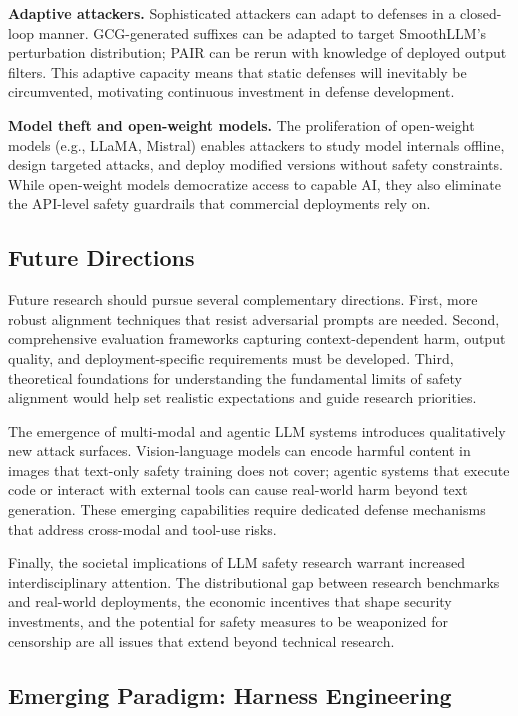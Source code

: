 \documentclass[conference]{IEEEtran}
\begin{document}
\textbf{Adaptive attackers.} Sophisticated attackers can adapt to defenses in a closed-loop manner. GCG-generated suffixes can be adapted to target SmoothLLM's perturbation distribution; PAIR can be rerun with knowledge of deployed output filters. This adaptive capacity means that static defenses will inevitably be circumvented, motivating continuous investment in defense development.

\textbf{Model theft and open-weight models.} The proliferation of open-weight models (e.g., LLaMA, Mistral) enables attackers to study model internals offline, design targeted attacks, and deploy modified versions without safety constraints. While open-weight models democratize access to capable AI, they also eliminate the API-level safety guardrails that commercial deployments rely on.

\subsection{Future Directions}

Future research should pursue several complementary directions. First, more robust alignment techniques that resist adversarial prompts are needed. Second, comprehensive evaluation frameworks capturing context-dependent harm, output quality, and deployment-specific requirements must be developed. Third, theoretical foundations for understanding the fundamental limits of safety alignment would help set realistic expectations and guide research priorities.

The emergence of multi-modal and agentic LLM systems introduces qualitatively new attack surfaces. Vision-language models can encode harmful content in images that text-only safety training does not cover; agentic systems that execute code or interact with external tools can cause real-world harm beyond text generation. These emerging capabilities require dedicated defense mechanisms that address cross-modal and tool-use risks.

Finally, the societal implications of LLM safety research warrant increased interdisciplinary attention. The distributional gap between research benchmarks and real-world deployments, the economic incentives that shape security investments, and the potential for safety measures to be weaponized for censorship are all issues that extend beyond technical research.

\subsection{Emerging Paradigm: Harness Engineering}
\end{document}
